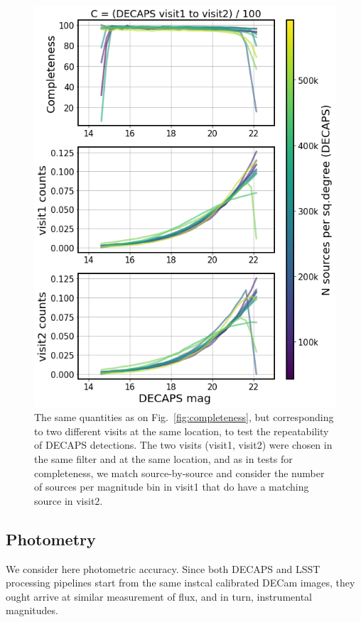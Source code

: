 \documentclass[DM,lsstdraft,toc,usenatbib]{lsstdoc}
\begin{document}
\begin{figure}
\begin{centering}
\includegraphics[width=0.75\columnwidth]{figs/completeness_3_decaps.png}
\caption{The same quantities as on Fig.~\ref{fig:completeness}, but corresponding to two different visits at the same location, to test the repeatability of DECAPS detections. The two visits (visit1, visit2) were chosen in the same filter and at the same location, and as in tests for completeness, we match source-by-source and consider the number of sources per magnitude bin in visit1 that do have a matching source in visit2. }
\label{fig:completeness_decaps}
\end{centering}
\end{figure} 




\subsection{Photometry}
\label{sec:photometry}

We consider here photometric accuracy. Since both DECAPS and LSST processing pipelines start from the same instcal calibrated DECam images, they ought arrive at similar measurement of flux, and in turn, instrumental magnitudes.  
\end{document}
